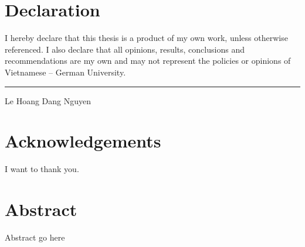 \documentclass[12pt,twoside]{report}
\begin{document}
\section *{\centering Declaration}
\doublespacing
\large I hereby declare that this thesis is a product of my own work, unless
otherwise referenced. I also declare that all opinions, results, conclusions
and recommendations are my own and may not represent the policies or
opinions of Vietnamese – German University.

\vspace{12cm}  %

\noindent\hfill\rule{8cm}{0.4pt}  %
\vspace{0.5cm} %

\noindent\hspace{8cm} Le Hoang Dang Nguyen %
\newpage

\thispagestyle{empty}
\section *{\centering Acknowledgements}
I want to thank you.
\newpage

\thispagestyle{empty}
\section*{\centering Abstract}
Abstract go here
\newpage

\renewcommand{\contentsname}{Table of Contents}
\tableofcontents

\listoffigures
\lstlistoflistings 
\printglossary[type=\acronymtype, title = Abbreviations, nonumberlist]
\newpage











\printbibliography[title={References}]
\end{document}
